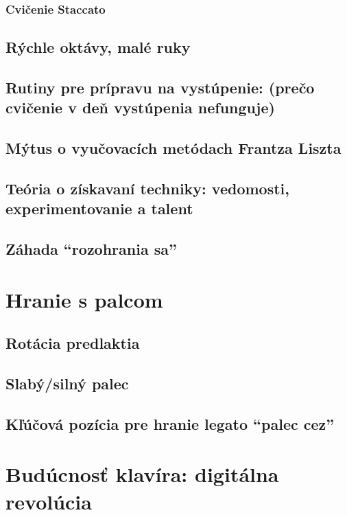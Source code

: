 \documentclass[11pt,a4paper%
]{article}
\begin{document}
\subsubsection{Cvičenie Staccato}

\subsection{Rýchle oktávy, malé ruky}

\subsection{Rutiny pre prípravu na vystúpenie: (prečo cvičenie v deň vystúpenia nefunguje)}

\subsection{Mýtus o vyučovacích metódach Frantza Liszta}

\subsection{Teória o získavaní techniky: vedomosti, experimentovanie a talent}

\subsection{Záhada “rozohrania sa”}

\section{Hranie s palcom}

\subsection{Rotácia predlaktia}

\subsection{Slabý/silný palec}

\subsection{Kľúčová pozícia pre hranie legato “palec cez”}

\section{Budúcnosť klavíra: digitálna revolúcia}
\end{document}
